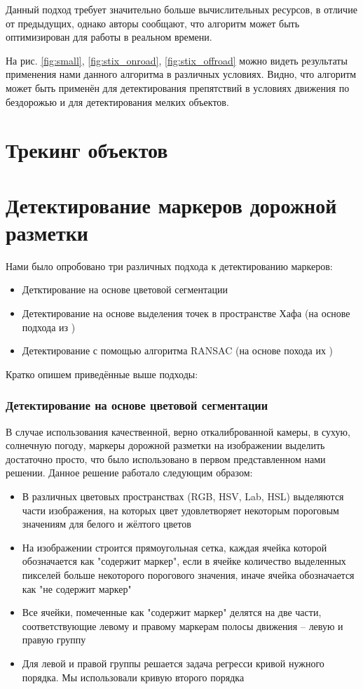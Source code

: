 \documentclass[aps,%
14pt,%
final,%
oneside,
onecolumn,%
musixtex, %
superscriptaddress,%
centertags]{extarticle} %
\begin{document}
Данный подход требует значительно больше вычислительных ресурсов, в отличие от предыдущих, однако авторы \cite{benenson2011stixels} сообщают, что алгоритм может быть оптимизирован для работы в реальном времени.

На рис. \ref{fig:small}, \ref{fig:stix_onroad}, \ref{fig:stix_offroad} можно видеть результаты применения нами данного алгоритма в различных условиях. Видно, что алгоритм может быть применён для детектирования препятствий в условиях движения по бездорожью и для детектирования мелких объектов.

\section{Трекинг объектов}

\section{Детектирование маркеров дорожной разметки}
Нами было опробовано три различных подхода к детектированию маркеров:
\begin{itemize}
    \item Детктирование на основе цветовой сегментации
    \item Детектирование на основе выделения точек в пространстве Хафа (на основе подхода из \cite{song2017real} )
    \item Детектирование с помощью алгоритма RANSAC (на основе похода их \cite{aly2008real} )
\end{itemize}

Кратко опишем приведённые выше подходы:

\subsubsection*{Детектирование на основе цветовой сегментации}

В случае использования качественной, верно откалиброванной камеры, в сухую, солнечную погоду, маркеры дорожной разметки на изображении выделить достаточно просто, что было использовано в первом представленном нами решении. Данное решение работало следующим образом:
\begin{itemize}
    \item В различных цветовых пространствах (RGB, HSV, Lab, HSL) выделяются части изображения, на которых цвет удовлетворяет некоторым пороговым значениям для белого и жёлтого цветов
    \item На изображении строится прямоугольная сетка, каждая ячейка которой обозначается как "содержит маркер", если в ячейке количество выделенных пикселей больше некоторого порогового значения, иначе ячейка обозначается как "не содержит маркер"
    \item Все ячейки, помеченные как "содержит маркер" делятся на две части, соответствующие левому и правому маркерам полосы движения -- левую и правую группу
    \item Для левой и правой группы решается задача регресси кривой нужного порядка. Мы использовали кривую второго порядка
\end{itemize}
\end{document}
